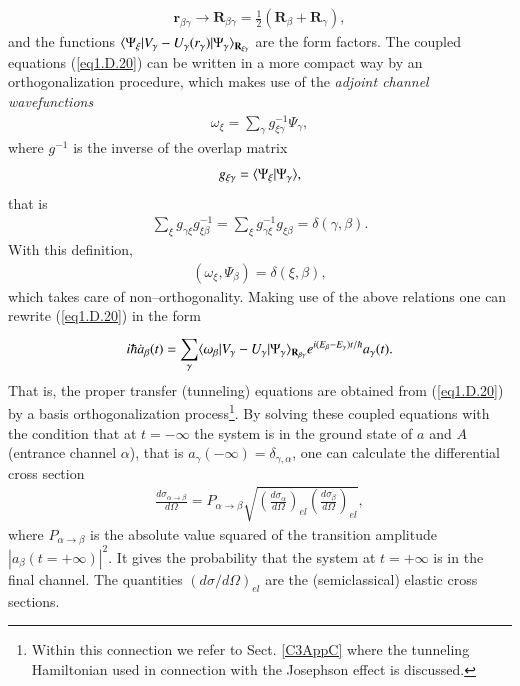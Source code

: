 \begin{subappendices}
\begin{align}\label{eq1.D.21}
\mathbf r_{\beta\gamma}\rightarrow\mathbf R_{\beta\gamma}=\frac{1}{2}(\mathbf R_\beta+\mathbf R_\gamma),
\end{align}
and the functions $\langle {\Psi_\xi|V_\gamma-U_\gamma(r_\gamma)|\Psi_\gamma} \rangle_{\mathbf R_{\xi\gamma}}$
 are the form factors. The coupled equations (\ref{eq1.D.20}) can be written in a more compact way by an orthogonalization procedure, which makes use of the \textit{adjoint channel wavefunctions}
\begin{align}\label{eq1.D.22}
\omega_\xi=\sum_{\gamma}g^{-1}_{\xi\gamma}\Psi_\gamma,
\end{align}
where $g^{-1}$ is the inverse of the overlap matrix
\begin{align}\label{eq1.D.23}
g_{\xi\gamma}=\langle {\Psi_\xi|\Psi_\gamma} \rangle,
\end{align}
that is
\begin{align}\label{eq1.D.24}
\sum_{\xi}g_{\gamma\xi}g^{-1}_{\xi\beta}=\sum_{\xi}^{}g^{-1}_{\gamma\xi}g_{\xi\beta}=\delta(\gamma,\beta).
\end{align}
With this definition,
\begin{align}\label{eq1.D.25}
(\omega_\xi,\Psi_\beta)=\delta(\xi,\beta),
\end{align}
which takes care of non--orthogonality. Making use of the above relations one can rewrite (\ref{eq1.D.20}) in the form
\begin{align}\label{eq1.D.26}
i\hbar \dot a_\beta(t)=\sum_{\gamma}^{}\langle {\omega_\beta|V_\gamma-U_\gamma|\Psi_\gamma} \rangle_{\mathbf R_{\beta\gamma}}e^{i(E_\beta-E_\gamma)t/\hbar}a_\gamma(t).
\end{align}
That is, the proper transfer (tunneling) equations are obtained from (\ref{eq1.D.20}) by a basis orthogonalization process\footnote{Within this connection we refer to Sect. \ref{C3AppC} where the tunneling Hamiltonian used in connection with the Josephson effect is discussed.}. 
 By solving these coupled equations with the condition that at $t=-\infty$ the system is in the ground state of $a$ and $A$ (entrance channel $\alpha$), that is $a_\gamma(-\infty)=\delta_{\gamma,\alpha}$, one can calculate the differential cross section
 \begin{align}\label{eq1.D.27}
 \frac{d\sigma_{\alpha\rightarrow\beta}}{d\Omega}=P_{\alpha\rightarrow\beta}\sqrt{\left(\frac{d\sigma_\alpha}{d\Omega}\right)_{el}\left(\frac{d\sigma_\beta}{d\Omega}\right)_{el}},
 \end{align}
 where $P_{\alpha\rightarrow\beta}$ is the absolute value squared of the transition amplitude $|a_{\beta}(t=+\infty)|^2$. It gives the probability that the system at $t=+\infty$ is in the final channel. The quantities $(d\sigma/d\Omega)_{el}$ are the (semiclassical) elastic cross sections. 
 

\end{subappendices}
